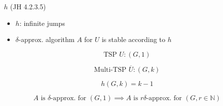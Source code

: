 \begin{frame}
  \begin{exampleblock}{$h$ (JH 4.2.3.5)}
	\begin{itemize}
	  \item $h$: infinite jumps
	  \item $\delta$-approx. algorithm $A$ for $U$ is stable according to $h$
	\end{itemize}
  \end{exampleblock}

  \[
	\text{TSP } U:  (G, 1)
  \]

  \[
	\text{Multi-TSP } \overline{U}: (G, k)
  \]

  \[
	h(G,k) = k-1
  \]

  \[
	A \text{ is } \delta\text{-approx. for } (G, 1) \implies A \text{ is } r\delta\text{-approx. for } (G,r \in \mathbb{N})
  \]
\end{frame}
